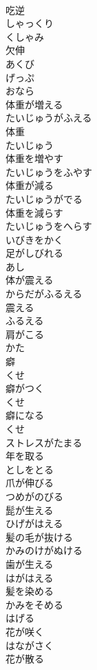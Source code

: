 \documentclass[8pt]{extreport}
\begin{document}
\begin{CJK}{UTF8}{min}
\\	吃逆	
\\	しゃっくり
\\	くしゃみ	
\\	欠伸	
\\	あくび
\\	げっぷ	
\\	おなら	
\\	体重が増える	
\\	たいじゅうがふえる
\\	体重	
\\	たいじゅう
\\	体重を増やす	
\\	たいじゅうをふやす
\\	体重が減る	
\\	たいじゅうがでる
\\	体重を減らす	
\\	たいじゅうをへらす
\\	いびきをかく	
\\	足がしびれる	
\\	あし
\\	体が震える	
\\	からだがふるえる
\\	震える	
\\	ふるえる
\\	肩がこる	
\\	かた
\\	癖	
\\	くせ
\\	癖がつく	
\\	くせ
\\	癖になる	
\\	くせ
\\	ストレスがたまる	
\\	年を取る	
\\	としをとる
\\	爪が伸びる	
\\	つめがのびる
\\	髭が生える	
\\	ひげがはえる
\\	髪の毛が抜ける	
\\	かみのけがぬける
\\	歯が生える	
\\	はがはえる
\\	髪を染める	
\\	かみをそめる
\\	はげる	
\\	花が咲く	
\\	はながさく
\\	花が散る	

\end{CJK}
\end{document}
